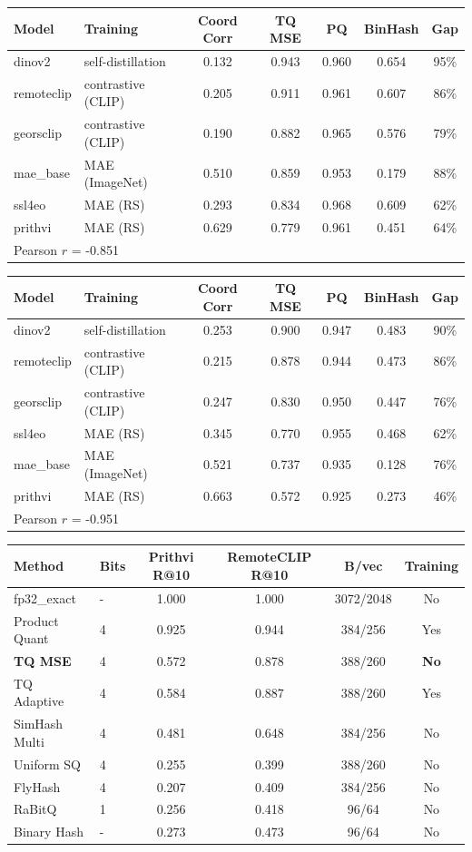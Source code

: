 \begin{tabular}{llccccc}
\toprule
Model & Training & Coord Corr & TQ MSE & PQ & BinHash & Gap \\
\midrule
dinov2 & self-distillation & 0.132 & 0.943 & 0.960 & 0.654 & 95\% \\
remoteclip & contrastive (CLIP) & 0.205 & 0.911 & 0.961 & 0.607 & 86\% \\
georsclip & contrastive (CLIP) & 0.190 & 0.882 & 0.965 & 0.576 & 79\% \\
mae\_base & MAE (ImageNet) & 0.510 & 0.859 & 0.953 & 0.179 & 88\% \\
ssl4eo & MAE (RS) & 0.293 & 0.834 & 0.968 & 0.609 & 62\% \\
prithvi & MAE (RS) & 0.629 & 0.779 & 0.961 & 0.451 & 64\% \\
\bottomrule
\multicolumn{7}{l}{Pearson $r$ = -0.851} \\
\end{tabular}

\begin{tabular}{llccccc}
\toprule
Model & Training & Coord Corr & TQ MSE & PQ & BinHash & Gap \\
\midrule
dinov2 & self-distillation & 0.253 & 0.900 & 0.947 & 0.483 & 90\% \\
remoteclip & contrastive (CLIP) & 0.215 & 0.878 & 0.944 & 0.473 & 86\% \\
georsclip & contrastive (CLIP) & 0.247 & 0.830 & 0.950 & 0.447 & 76\% \\
ssl4eo & MAE (RS) & 0.345 & 0.770 & 0.955 & 0.468 & 62\% \\
mae\_base & MAE (ImageNet) & 0.521 & 0.737 & 0.935 & 0.128 & 76\% \\
prithvi & MAE (RS) & 0.663 & 0.572 & 0.925 & 0.273 & 46\% \\
\bottomrule
\multicolumn{7}{l}{Pearson $r$ = -0.951} \\
\end{tabular}

\begin{tabular}{llcccc}
\toprule
Method & Bits & Prithvi R@10 & RemoteCLIP R@10 & B/vec & Training \\
\midrule
fp32\_exact & - & 1.000 & 1.000 & 3072/2048 & No \\
Product Quant & 4 & 0.925 & 0.944 & 384/256 & Yes \\
\textbf{TQ MSE} & 4 & 0.572 & 0.878 & 388/260 & \textbf{No} \\
TQ Adaptive & 4 & 0.584 & 0.887 & 388/260 & Yes \\
SimHash Multi & 4 & 0.481 & 0.648 & 384/256 & No \\
Uniform SQ & 4 & 0.255 & 0.399 & 388/260 & No \\
FlyHash & 4 & 0.207 & 0.409 & 384/256 & No \\
RaBitQ & 1 & 0.256 & 0.418 & 96/64 & No \\
Binary Hash & - & 0.273 & 0.473 & 96/64 & No \\
\bottomrule
\end{tabular}
